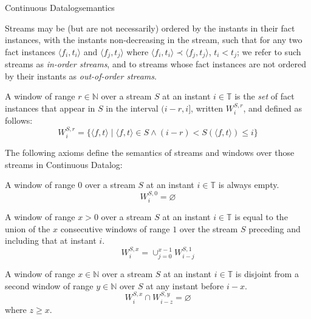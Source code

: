 \begin{nestedsection}{Continuous Datalog}{semantics}
\begin{definition}[Streams]
Streams may be (but are not necessarily) ordered by the instants in
their fact instances, with the instants non-decreasing in the stream,
such that for any two fact instances $\langle f_i, t_i \rangle$ and
$\langle f_j, t_j\rangle$ where $\langle f_i, t_i \rangle \prec
\langle f_j, t_j \rangle$, $t_i < t_j$; we refer to such
streams as {\em in-order streams}, and to streams whose fact instances
are not ordered by their instants as {\em out-of-order streams}.
\end{definition}

\begin{definition}[Window]

A window of range ${r \in \mathbb{N}}$ over a stream $S$ at an instant
${i \in \mathbb{T}}$ is the \emph{set} of fact instances that appear in
$S$ in the interval ${(i-r,i]}$, written ${W^{S,r}_{i}}$, and defined as follows:
\[
W^{S,r}_i = \{ \langle f, t \rangle \mid \langle f, t \rangle \in S \land (i - r) < S(\langle f, t\rangle) \leqslant i \}
\]  
\end{definition}

The following axioms define the semantics of streams and windows over
those streams in Continuous Datalog:

\begin{axiom}\label{axiom:continuous datalog: window range leq 0}
A window of range $0$ over a stream $S$ at an instant 
${i \in \mathbb{T}}$ is always empty.
\begin{equation*}
W^{S,0}_{i} = \varnothing
\end{equation*}
\end{axiom}

\begin{axiom}\label{axiom:continuous datalog: window composition}
A window of range ${x > 0}$ over a stream $S$ at an instant 
${i \in \mathbb{T}}$ is equal to the union of the $x$ consecutive
windows of range $1$ over the stream $S$ preceding and including that at
instant $i$.
\begin{equation*}
W^{S,x}_{i} = \mathop{\cup}_{j=0}^{x-1} W^{S,1}_{i-j}
\end{equation*}
\end{axiom}

\begin{axiom}\label{axiom:continuous datalog: window disjointness}
A window of range ${x \in \mathbb{N}}$ over a stream $S$ at an
instant ${i \in \mathbb{T}}$ is disjoint from a second window of 
range ${y \in \mathbb{N}}$ over $S$ at any instant before $i - x$.
\begin{equation*}
W^{S,x}_{i} \cap W^{S,y}_{i-z} = \varnothing
\end{equation*}
where $z \geq x$.
\end{axiom}


\end{nestedsection}
